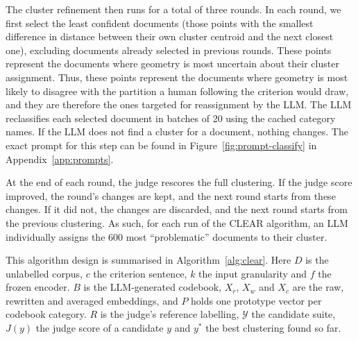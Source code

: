 \documentclass[11pt,a4paper,oneside]{report}
\begin{document}
The cluster refinement then runs for a total of three rounds. In each round, we first select the least confident documents (those points with the smallest difference in distance between their own cluster centroid and the next closest one), excluding documents already selected in previous rounds. These points represent the documents where geometry is most uncertain about their cluster assignment. Thus, these points represent the documents where geometry is most likely to disagree with the partition a human following the criterion would draw, and they are therefore the ones targeted for reassignment by the LLM. The LLM reclassifies each selected document in batches of 20 using the cached category names. If the LLM does not find a cluster for a document, nothing changes. The exact prompt for this step can be found in Figure~\ref{fig:prompt-classify} in Appendix~\ref{app:prompts}.

At the end of each round, the judge rescores the full clustering. If the judge score improved, the round's changes are kept, and the next round starts from these changes. If it did not, the changes are discarded, and the next round starts from the previous clustering. As such, for each run of the CLEAR algorithm, an LLM individually assigns the 600 most ``problematic'' documents to their cluster.

This algorithm design is summarised in Algorithm~\ref{alg:clear}. Here $D$ is the unlabelled corpus, $c$ the criterion sentence, $k$ the input granularity and $f$ the frozen encoder. $B$ is the LLM-generated codebook, $X_r$, $X_w$ and $X_c$ are the raw, rewritten and averaged embeddings, and $P$ holds one prototype vector per codebook category. $R$ is the judge's reference labelling, $\mathcal{Y}$ the candidate suite, $J(y)$ the judge score of a candidate $y$ and $y^{\ast}$ the best clustering found so far.
\end{document}
